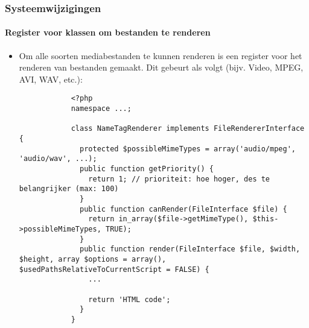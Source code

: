 
\begin{frame}[fragile]
	\frametitle{Systeemwijzigingen}
	\framesubtitle{Register voor klassen om bestanden te renderen}

	\lstset{
		basicstyle=\tiny\ttfamily
	}

	\begin{itemize}
		\item Om alle soorten mediabestanden te kunnen renderen is een register
			voor het renderen van bestanden gemaakt.\newline
			Dit gebeurt als volgt (bijv. Video, MPEG, AVI, WAV, etc.):

		\begin{lstlisting}
			<?php
			namespace ...;

			class NameTagRenderer implements FileRendererInterface {
			  protected $possibleMimeTypes = array('audio/mpeg', 'audio/wav', ...);
			  public function getPriority() {
			    return 1; // prioriteit: hoe hoger, des te belangrijker (max: 100)
			  }
			  public function canRender(FileInterface $file) {
			    return in_array($file->getMimeType(), $this->possibleMimeTypes, TRUE);
			  }
			  public function render(FileInterface $file, $width, $height, array $options = array(), $usedPathsRelativeToCurrentScript = FALSE) {
			    ...

			    return 'HTML code';
			  }
			}
		\end{lstlisting}

	\end{itemize}

\end{frame}


